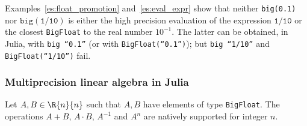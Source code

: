 \noindent Examples~\ref{es:float_promotion} and~\ref{es:eval_expr} show that neither \texttt{big(0.1)} nor $\mathtt{big(1/10)}$ is either the high precision evaluation of the expression $\mathtt{1/10}$ or the closest \texttt{BigFloat} to the real number $10^{-1}$. 
The latter can be obtained, in Julia, with \texttt{big\,``0.1''} (or with \texttt{BigFloat(``0.1'')}); but \texttt{big\,``1/10''} and \texttt{BigFloat(``1/10'')} fail.


\subsubsection*{Multiprecision linear algebra in Julia}
Let $A,B\in\R{n}{n}$ such that $A, B$ have elements of type \texttt{BigFloat}. The operations $A+B$, $A\cdot B$, $A^{-1}$ and $A^n$ are natively supported for integer $n$. 

